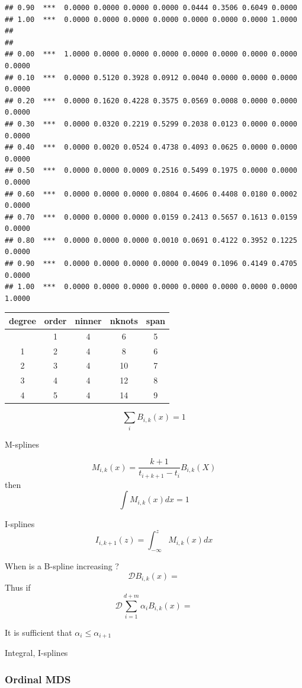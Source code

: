 \documentclass[
  12pt,
]{article}
\begin{document}
\begin{verbatim}
## 0.90  ***  0.0000 0.0000 0.0000 0.0000 0.0444 0.3506 0.6049 0.0000 
## 1.00  ***  0.0000 0.0000 0.0000 0.0000 0.0000 0.0000 0.0000 1.0000 
## 
## 
## 0.00  ***  1.0000 0.0000 0.0000 0.0000 0.0000 0.0000 0.0000 0.0000 0.0000 
## 0.10  ***  0.0000 0.5120 0.3928 0.0912 0.0040 0.0000 0.0000 0.0000 0.0000 
## 0.20  ***  0.0000 0.1620 0.4228 0.3575 0.0569 0.0008 0.0000 0.0000 0.0000 
## 0.30  ***  0.0000 0.0320 0.2219 0.5299 0.2038 0.0123 0.0000 0.0000 0.0000 
## 0.40  ***  0.0000 0.0020 0.0524 0.4738 0.4093 0.0625 0.0000 0.0000 0.0000 
## 0.50  ***  0.0000 0.0000 0.0009 0.2516 0.5499 0.1975 0.0000 0.0000 0.0000 
## 0.60  ***  0.0000 0.0000 0.0000 0.0804 0.4606 0.4408 0.0180 0.0002 0.0000 
## 0.70  ***  0.0000 0.0000 0.0000 0.0159 0.2413 0.5657 0.1613 0.0159 0.0000 
## 0.80  ***  0.0000 0.0000 0.0000 0.0010 0.0691 0.4122 0.3952 0.1225 0.0000 
## 0.90  ***  0.0000 0.0000 0.0000 0.0000 0.0049 0.1096 0.4149 0.4705 0.0000 
## 1.00  ***  0.0000 0.0000 0.0000 0.0000 0.0000 0.0000 0.0000 0.0000 1.0000
\end{verbatim}

\begin{longtable}[]{@{}ccccc@{}}
\toprule\noalign{}
degree & order & ninner & nknots & span \\
\midrule\noalign{}
\endhead
\bottomrule\noalign{}
\endlastfoot
0 & 1 & 4 & 6 & 5 \\
1 & 2 & 4 & 8 & 6 \\
2 & 3 & 4 & 10 & 7 \\
3 & 4 & 4 & 12 & 8 \\
4 & 5 & 4 & 14 & 9 \\
\end{longtable}

\[
\sum_i B_{i,k}(x)=1
\]

M-splines

\[
M_{i,k}(x)=\frac{k+1}{t_{i+k+1}-t_i}B_{i,k}(X)
\]
then
\[
\int M_{i,k}(x)dx=1
\]

I-splines
\[
I_{i,k+1}(z)=\int_{-\infty}^zM_{i,k}(x)dx
\]

When is a B-spline increasing ?
\[
\mathcal{D}B_{i,k}(x)=
\]
Thus if
\[
\mathcal{D}\sum_{i=1}^{d+m}\alpha_iB_{i,k}(x)=
\]

It is sufficient that \(\alpha_i\leq\alpha_{i+1}\)

Integral, I-splines

\subsubsection{Ordinal MDS}\label{ordinal-mds}
\end{document}
